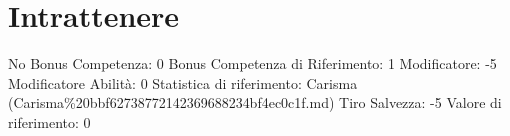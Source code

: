 \section{Intrattenere}\label{intrattenere}

\begin{description}
\tightlist
\item[Tags: ABI]
No Bonus Competenza: 0 Bonus Competenza di Riferimento: 1 Modificatore:
-5 Modificatore Abilità: 0 Statistica di riferimento: Carisma
(Carisma\%20bbf62738772142369688234bf4ec0c1f.md) Tiro Salvezza: -5
Valore di riferimento: 0
\end{description}
